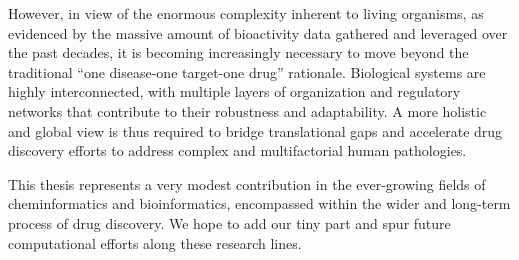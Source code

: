 However, in view of the enormous complexity inherent to living organisms, as evidenced by the massive amount of bioactivity data gathered and leveraged over the past decades, it is becoming increasingly necessary to move beyond the traditional “one disease-one target-one drug” rationale. Biological systems are highly interconnected, with multiple layers of organization and regulatory networks that contribute to their robustness and adaptability. A more holistic and global view is thus required to bridge translational gaps and accelerate drug discovery efforts to address complex and multifactorial human pathologies.

This thesis represents a very modest contribution in the ever-growing fields of cheminformatics and bioinformatics, encompassed within the wider and long-term process of drug discovery. We hope to add our tiny part and spur future computational efforts along these research lines.

